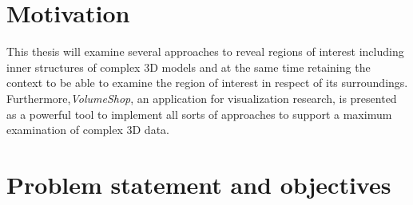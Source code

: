 \section{Motivation}
This thesis will examine several approaches to reveal regions of interest including inner structures of complex 3D models and at the same time retaining the context to be able to examine the region of interest in respect of its surroundings. Furthermore,\emph{VolumeShop}, an application for visualization research, is presented as a powerful tool to implement all sorts of approaches to support a maximum examination of complex 3D data.

\section{Problem statement and objectives}

